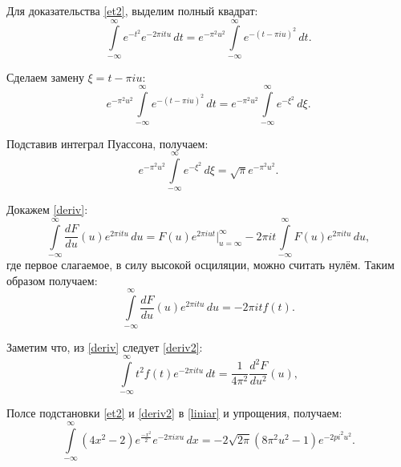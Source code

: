 {\begin{enumerate}
{			Для доказательства \eqref{et2}, выделим полный квадрат:
			\begin{equation}
			\int\limits_{-\infty}^{\infty} e^{-t^2} e^{-2 \pi i t u} \, dt 
			= e^{-\pi^2 u^2} \int\limits_{-\infty}^{\infty} e^{-(t - \pi i u)^2} \, dt.\nonumber
			\end{equation}
			
			Сделаем замену $\xi = t - \pi i u$:
			\begin{equation}
			e^{-\pi^2 u^2} \int\limits_{-\infty}^{\infty} e^{-(t - \pi i u)^2} \, dt
			= e^{-\pi^2 u^2} \int\limits_{-\infty}^{\infty} e^{-\xi^2} \, d\xi.\nonumber
			\end{equation}
			
			Подставив интеграл Пуассона, получаем:
			\begin{equation}
			e^{-\pi^2 u^2} \int\limits_{-\infty}^{\infty} e^{-\xi^2} \, d\xi
			= \sqrt{\pi} e^{-\pi^2 u^2}.\nonumber
			\end{equation}
			
			Докажем \eqref{deriv}:
			\begin{equation*}
			\int\limits_{-\infty}^{\infty} \frac{d F}{d u} (u) e^{2 \pi i t u} \, du  = F(u) e^{2 \pi i u t} \vert_{u=\infty}^{\infty} - 2\pi i t \int\limits_{-\infty}^{\infty} F(u) e^{2 \pi i t u} \, du,
			\end{equation*}
			где первое слагаемое, в силу высокой осциляции, можно считать нулём. Таким образом получаем:
			\begin{equation*}
			\int\limits_{-\infty}^{\infty} \frac{d F}{d u} (u) e^{2 \pi i t u} \, du  = - 2\pi i t f(t).
			\end{equation*}
			
			Заметим что, из \eqref{deriv} следует \eqref{deriv2}:
			\begin{equation}\label{deriv2}
			\int\limits_{-\infty}^{\infty} t^2 f(t) e^{-2 \pi i t u} \, dt = \frac{1}{4 \pi^2} \frac{d^2 F}{d u^2} (u),
			\end{equation}
			
			Полсе подстановки \eqref{et2} и \eqref{deriv2} в \eqref{liniar} и упрощения, получаем:
			\begin{equation}
			\int\limits_{-\infty}^{\infty} (4 x^2 - 2) e^{\frac{-x^2}{2}} e^{-2 \pi i x u} \,dx
			= -2\sqrt{2 \pi} (8 \pi^2 u^2 - 1) e^{-2 pi^2 u^2}.\nonumber
			\end{equation}
			
}
\end{enumerate}}

